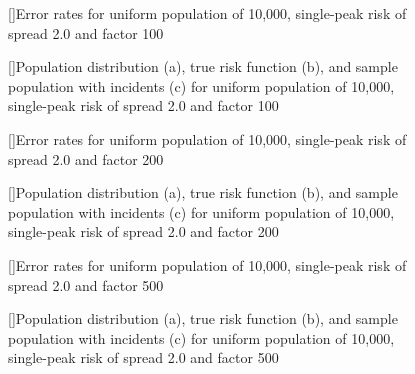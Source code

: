 {%

\begin{figure}[!htb]
    
    []{Error rates for uniform population of 10,000, single-peak risk of \gls{spread} 2.0 and \gls{factor} 100}
    \label{tab:mean_error_rates:unif_100_2.0_1h}
    
    []{Population distribution (a), true risk function (b), and sample population with incidents (c) for uniform population of 10,000, single-peak risk of \gls{spread} 2.0 and \gls{factor} 100}
    \label{fig:distributions:unif_100_2.0_1h}    
\end{figure}



\begin{figure}[!htb]
    
    []{Error rates for uniform population of 10,000, single-peak risk of \gls{spread} 2.0 and \gls{factor} 200}
    \label{tab:mean_error_rates:unif_200_2.0_1h}
    
    []{Population distribution (a), true risk function (b), and sample population with incidents (c) for uniform population of 10,000, single-peak risk of \gls{spread} 2.0 and \gls{factor} 200}
    \label{fig:distributions:unif_200_2.0_1h}    
\end{figure}



\begin{figure}[!htb]
    
    []{Error rates for uniform population of 10,000, single-peak risk of \gls{spread} 2.0 and \gls{factor} 500}
    \label{tab:mean_error_rates:unif_500_2.0_1h}
    
    []{Population distribution (a), true risk function (b), and sample population with incidents (c) for uniform population of 10,000, single-peak risk of \gls{spread} 2.0 and \gls{factor} 500}
    \label{fig:distributions:unif_500_2.0_1h}    
\end{figure}



}
